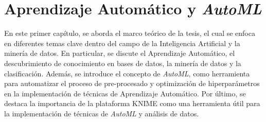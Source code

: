 \chapter{Aprendizaje Automático y \textit{AutoML}}\label{chap:1}

En este primer capítulo, se aborda el marco teórico de la tesis, el cual se enfoca en diferentes temas clave dentro del campo de la Inteligencia Artificial y la minería de datos. En particular, se discute el Aprendizaje Automático, el descubrimiento de conocimiento en bases de datos, la minería de datos y la clasificación. Además, se introduce el concepto de \textit{AutoML}, como herramienta para automatizar el proceso de pre-procesado y optimización de hiperparámetros en la implementación de técnicas de Aprendizaje Automático. Por último, se destaca la importancia de la plataforma KNIME como una herramienta útil para la implementación de técnicas de \textit{AutoML} y análisis de datos.

